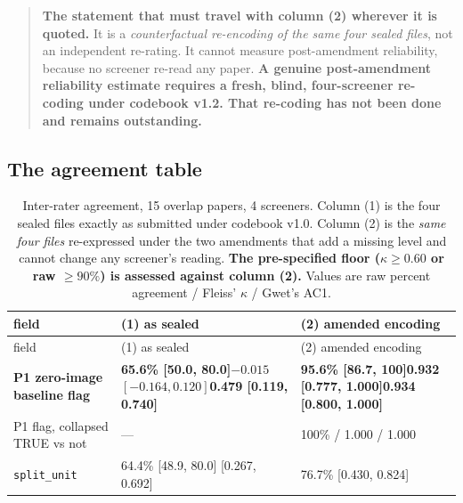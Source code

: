 \documentclass[11pt,a4paper]{article}
\begin{document}
\begin{quote}
\textbf{The statement that must travel with column (2) wherever it is quoted.} It is a
\emph{counterfactual re-encoding of the same four sealed files}, not an independent
re-rating. It cannot measure post-amendment reliability, because no screener re-read
any paper. \textbf{A genuine post-amendment reliability estimate requires a fresh,
blind, four-screener re-coding under codebook v1.2. That re-coding has not been done
and remains outstanding.}
\end{quote}

\subsection{The agreement table}

{\small
\begin{longtable}{@{}L{4.6cm}L{4.9cm}L{4.4cm}@{}}
\caption{Inter-rater agreement, 15 overlap papers, 4 screeners. Column (1) is the
four sealed files exactly as submitted under codebook v1.0. Column (2) is the
\emph{same four files} re-expressed under the two amendments that add a missing level
and cannot change any screener's reading. \textbf{The pre-specified floor
($\kappa \ge 0.60$ or raw $\ge 90\%$) is assessed against column (2).} Values are
raw percent agreement / Fleiss' $\kappa$ / Gwet's AC1.}
\label{tab:agreement}\\
\toprule
field & (1) as sealed & (2) amended encoding \\
\midrule
\endfirsthead
\toprule
field & (1) as sealed & (2) amended encoding \\
\midrule
\endhead
\bottomrule
\endfoot
\textbf{P1 zero-image baseline flag} &
\textbf{65.6\% [50.0, 80.0]}\newline \textbf{$-0.015$ $[-0.164, 0.120]$}\newline \textbf{0.479 [0.119, 0.740]} &
\textbf{95.6\% [86.7, 100]}\newline \textbf{0.932 [0.777, 1.000]}\newline \textbf{0.934 [0.800, 1.000]} \\
P1 flag, collapsed TRUE vs not & --- & 100\% / 1.000 / 1.000 \\
\texttt{split\_unit} &
64.4\% [48.9, 80.0] [0.267, 0.692] &
76.7\% [0.430, 0.824] \\

\end{longtable}}
\end{document}
